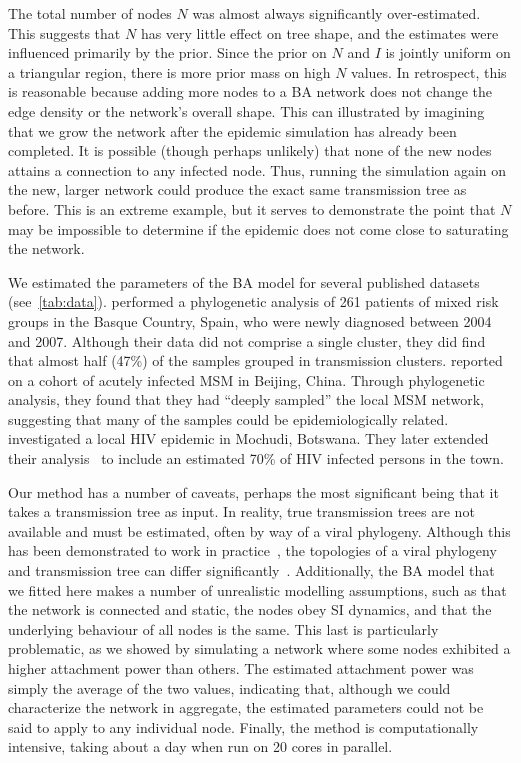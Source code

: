 \documentclass[12pt]{article}\usepackage[]{graphicx}\usepackage[]{color}
\begin{document}

The total number of nodes $N$ was almost always significantly over-estimated.
This suggests that $N$ has very little effect on tree shape, and the estimates
were influenced primarily by the prior. Since the prior on $N$ and $I$ is
jointly uniform on a triangular region, there is more prior mass on high $N$
values. In retrospect, this is reasonable because adding more nodes to a
\gls{BA} network does not change the edge density or the network's overall
shape. This can illustrated by imagining that we grow the network after the
epidemic simulation has already been completed. It is possible (though perhaps
unlikely) that none of the new nodes attains a connection to any infected node.
Thus, running the simulation again on the new, larger network could produce the
exact same transmission tree as before. This is an extreme example, but it
serves to demonstrate the point that $N$ may be impossible to determine if the
epidemic does not come close to saturating the network.


We estimated the parameters of the \gls{BA} model for several published
datasets (see~\ref{tab:data}). \textcite{cuevas2009hiv} performed a
phylogenetic analysis of 261 patients of mixed risk groups in the Basque
Country, Spain, who were newly diagnosed between 2004 and 2007. Although their
data did not comprise a single cluster, they did find that almost half (47\%)
of the samples grouped in transmission clusters. \textcite{wang2015targeting}
reported on a cohort of acutely infected \gls{MSM} in Beijing, China. Through
phylogenetic analysis, they found that they had ``deeply sampled'' the local
\gls{MSM} network, suggesting that many of the samples could be
epidemiologically related. \textcite{novitsky2013phylogenetic} investigated a
local HIV epidemic in Mochudi, Botswana. They later extended their
analysis~\autocite{novitsky2014impact} to include an estimated 70\% of HIV
infected persons in the town. 

Our method has a number of caveats, perhaps the most significant being that it
takes a transmission tree as input. In reality, true transmission trees are not
available and must be estimated, often by way of a viral phylogeny. Although
this has been demonstrated to work in practice~\autocite{leitner1996accurate},
the topologies of a viral phylogeny and transmission tree can differ
significantly~\autocite{ypma2013relating}. Additionally, the \gls{BA} model
that we fitted here makes a number of unrealistic modelling assumptions, such
as that the network is connected and static, the nodes obey \gls{SI} dynamics,
and that the underlying behaviour of all nodes is the same. This last is
particularly problematic, as we showed by simulating a network where some nodes
exhibited a higher attachment power than others. The estimated attachment power
was simply the average of the two values, indicating that, although we could
characterize the network in aggregate, the estimated parameters could not be
said to apply to any individual node. Finally, the method is computationally
intensive, taking about a day when run on 20 cores in parallel.
\end{document}

